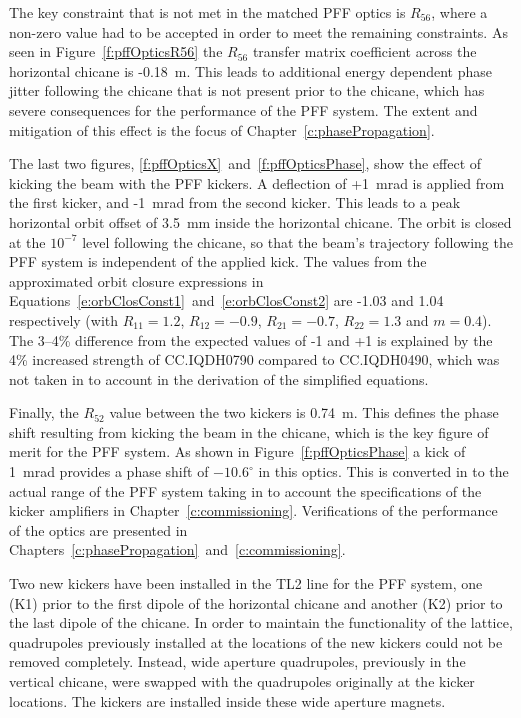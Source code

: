 The key constraint that is not met in the matched PFF optics is \(R_{56}\), where a non-zero value had to be accepted in order to meet the remaining constraints. As seen in Figure~\ref{f:pffOpticsR56} the \(R_{56}\) transfer matrix coefficient across the horizontal chicane is -0.18~m. This leads to additional energy dependent phase jitter following the chicane that is not present prior to the chicane, which has severe consequences for the performance of the PFF system. The extent and mitigation of this effect is the focus of Chapter~\ref{c:phasePropagation}.

The last two figures, \ref{f:pffOpticsX}~and~\ref{f:pffOpticsPhase}, show the effect of kicking the beam with the PFF kickers. A deflection of +1~mrad is applied from the first kicker, and -1~mrad from the second kicker. This leads to a peak horizontal orbit offset of 3.5~mm inside the horizontal chicane. The orbit is closed at the \(10^{-7}\) level following the chicane, so that the beam's trajectory following the PFF system is independent of the applied kick. The values from the approximated orbit closure expressions in Equations~\ref{e:orbClosConst1}~and~\ref{e:orbClosConst2} are -1.03 and 1.04 respectively (with \(R_{11} = 1.2\), \(R_{12} = -0.9\), \(R_{21} = -0.7\), \(R_{22} = 1.3\) and \(m = 0.4\)). The 3--4\% difference from the expected values of -1 and +1 is explained by the 4\% increased strength of CC.IQDH0790 compared to CC.IQDH0490, which was not taken in to account in the derivation of the simplified equations.

Finally, the \(R_{52}\) value between the two kickers is 0.74~m. This defines the phase shift resulting from kicking the beam in the chicane, which is the key figure of merit for the PFF system. As shown in Figure~\ref{f:pffOpticsPhase} a kick of 1~mrad provides a phase shift of \(-10.6^\circ\) in this optics. This is converted in to the actual range of the PFF system taking in to account the specifications of the kicker amplifiers in Chapter~\ref{c:commissioning}. Verifications of the performance of the optics are presented in Chapters~\ref{c:phasePropagation}~and~\ref{c:commissioning}.




Two new kickers have been installed in the TL2 line for the PFF system, one (K1) prior to the first dipole of the horizontal chicane and another (K2) prior to the last dipole of the chicane. In order to maintain the functionality of the lattice, quadrupoles previously installed at the locations of the new kickers could not be removed completely.
Instead, wide aperture quadrupoles, previously in the vertical chicane, were swapped with the quadrupoles originally at the kicker locations. The kickers are installed inside these wide aperture magnets.

